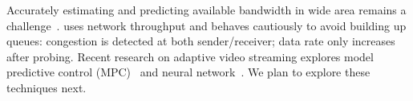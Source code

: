  Accurately estimating and predicting
available bandwidth in wide area remains a challenge~\cite{huang2012confused,
  zou2015can}. \sysname{} uses network throughput and behaves cautiously to
avoid building up queues: congestion is detected at both sender/receiver; data
rate only increases after probing.  Recent research on adaptive video streaming
explores model predictive control (MPC)~\cite{yin2015control, sun2016cs2p} and
neural network~\cite{mao2017neural}. We plan to explore these techniques next.


